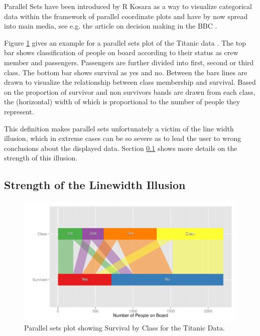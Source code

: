 Parallel Sets have been introduced by R Kosara \citep{kosara:2006} as a way to visualize categorical data within the framework of parallel coordinate plots  and have by now spread into main media, see e.g. the article on decision making in the BBC \citep{bbc:2009}. 

Figure \ref{question1a} gives an example for a parallel sets plot of the Titanic data \citep{dawson:1995}. The top bar shows classification of people on board according to their status as crew member and passengers. Passengers are further divided into first, second or third class. The bottom bar shows survival  as yes and no. Between the bars lines are drawn to visualize the relationship between class membership and  survival. Based on the proportion of survivor and non survivors bands are drawn from each class, the (horizontal) width of which is proportional to the number of people they represent. 

This definition makes parallel sets unfortunately a victim of the line width illusion, which in extreme cases can be so severe as to lead the user to wrong conclusions about the displayed data.  Section \ref{distortion}  shows more details on the strength of this illusion.


\subsection{Strength of the Linewidth Illusion}\label{distortion}
\begin{figure}[hbtp]
\centering
\includegraphics[width=.9\linewidth]{images/parset-titanic}
\caption{\label{question1a} Parallel sets plot showing Survival by Class for the Titanic Data. }
\end{figure}

